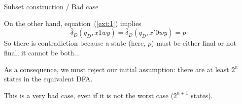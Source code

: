 %
\begin{frame}{Subset construction / Bad case}

On the other hand, equation~(\ref{ext:1}) implies
\[
\hat{\delta}_D (q_D, x1wy) = \hat{\delta}_D (q_D, x'0wy) = p
\]
So there is contradiction because a state (here, \(p\)) must be either
final or not final, it cannot be both...

\bigskip

As a consequence, we must reject our initial assumption: there are at
least \(2^n\) states in the equivalent DFA.

\bigskip

This is a very bad case, even if it is not the worst case (\(2^{n+1}\)
states).

\end{frame}
